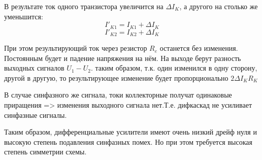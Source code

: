 В результате ток одного транзистора увеличится на $\Delta I_K$, а другого на столько же уменьшится:
$$
I'_{K1} = I_{K1} + \Delta I_K
$$ 
$$
I'_{K2} = I_{K2} + \Delta I_K
$$ 

При этом результирующий ток через резистор $R_e$ останется без изменения. Постоянным будет и падение напряжения на нём. На выходе берут разность выходных сигналов $U_1 - U_2$. таким образом, т.к. один изменился в одну сторону, другой в другую, то результирующее изменение будет пропорционально $2\Delta I_K R_K$

В случае синфазного же сигнала, токи коллекторные получат одинаковые приращения => изменения выходного сигнала нет.Т.е. дифкаскад не усиливает синфазные сигналы.

Таким образом, дифференциальные усилители имеют очень низкий дрейф нуля и высокую степень подавления синфазных помех. Но при этом требуется высокая степень симметрии схемы.

\pagebreak
